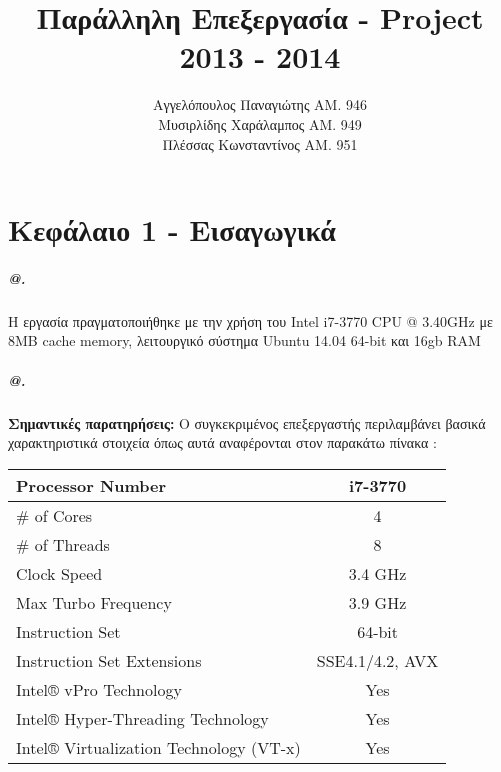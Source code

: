 \documentclass[greek,booktabs,8pt,flagBlueCMYK]{report}
\title{Παράλληλη Επεξεργασία - Project \\ 2013 - 2014}
\author{Αγγελόπουλος Παναγιώτης ΑΜ. 946 \\ Μυσιρλίδης Χαράλαμπος ΑΜ. 949\\ Πλέσσας Κωνσταντίνος ΑΜ. 951}
\date{\parbox{\linewidth}{\centering%
  \today\endgraf\bigskip
  e-mail:\{angelop,mysirlidis,kplessas\}@ceid.upatras.gr \endgraf
  \LaTeX \endgraf}}
\begin{document}
\maketitle

\makeatletter
\renewcommand{\@makechapterhead}[1]{%
  \vspace*{50\p@}%
  {\parindent \z@ \raggedright \normalfont
  \hrule                                        %
  \vspace{5pt}%
  \interlinepenalty\@M
  \Huge \scshape #1\par                         %
  \vspace{5pt}%
  \hrule                                        %
  \nobreak
  \vskip 40\p@
  }
}
\makeatother

\makeatletter
\newcommand*{\rom}[1]{\expandafter\@slowromancap\romannumeral #1@}
\makeatother

\tableofcontents
\large
\chapter{Κεφάλαιο 1 - Εισαγωγικά}
\paragraph{\rom{1}.} Η εργασία πραγματοποιήθηκε με την χρήση του Intel i7-3770 CPU @ 3.40GHz με 8MB cache memory, λειτουργικό σύστημα Ubuntu 14.04 64-bit και 16gb RAM\newline

\paragraph{\rom{2}.}\textbf{Σημαντικές παρατηρήσεις:}\newline
Ο συγκεκριμένος επεξεργαστής περιλαμβάνει βασικά χαρακτηριστικά στοιχεία όπως αυτά αναφέρονται στον παρακάτω πίνακα : \newline 

\begin{center}
\begin{tabular}{ l | c }
  \hline
  Processor Number &	i7-3770 \\ \hline
  \# of Cores &	4 \\ \hline
  \# of Threads &	8 \\ \hline
  Clock Speed &	3.4 GHz \\ \hline
  Max Turbo Frequency &	3.9 GHz \\ \hline
  Instruction Set &	64-bit\\ \hline
  Instruction Set Extensions &	SSE4.1/4.2, AVX\\ \hline
  Intel® vPro Technology	& Yes\\ \hline
  Intel® Hyper-Threading Technology &	Yes\\ \hline
  Intel® Virtualization Technology (VT-x) & 	Yes\\ \hline
\end{tabular}
\end{center}
\end{document}
